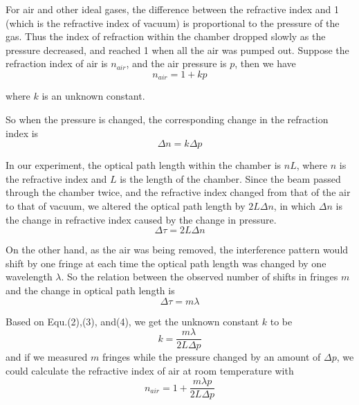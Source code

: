 \documentclass{article}
\begin{document}
For air and other ideal gases, the difference between the refractive index and 1 (which is the refractive index of vacuum) is proportional to the pressure of the gas. Thus the index of refraction within the chamber dropped slowly as the pressure decreased, and reached 1 when all the air was pumped out. Suppose the refraction index of air is $n_{air}$, and the air pressure is $p$, then we have
\begin{equation}
	n_{air}=1+kp
\end{equation}

where $k$ is an unknown constant. 

So when the pressure is changed, the corresponding change in the refraction index is
\begin{equation}
\Delta{n}=k\Delta{p}
\end{equation} 

In our experiment, the optical path length within the chamber is $nL$, where $n$ is the refractive index and $L$ is the length of the chamber. Since the beam passed through the chamber twice, and the refractive index changed from that of the air to that of vacuum, we altered the optical path length by $2L\Delta{n}$, in which $\Delta{n}$ is the change in refractive index caused by the change in pressure. 
\begin{equation}
	\Delta{\tau}=2L\Delta{n}
\end{equation}

On the other hand, as the air was being removed, the interference pattern would shift by one fringe at each time the optical path length was changed by one wavelength $\lambda$. So the relation between the observed number of shifts in fringes $m$ and the change in optical path length is 
\begin{equation}
	\Delta{\tau}=m\lambda
\end{equation}

Based on Equ.(2),(3), and(4), we get the unknown constant $k$ to be 
\begin{equation}
	k=\dfrac{m\lambda}{2L\Delta{p}}
\end{equation} 
and if we measured $m$ fringes while the pressure changed by an amount of $\Delta{p}$, we could calculate the refractive index of air at room temperature with
\begin{equation}
	n_{air}=1+\dfrac{m\lambda{p}}{2L\Delta{p}}
\end{equation}

\end{document}
